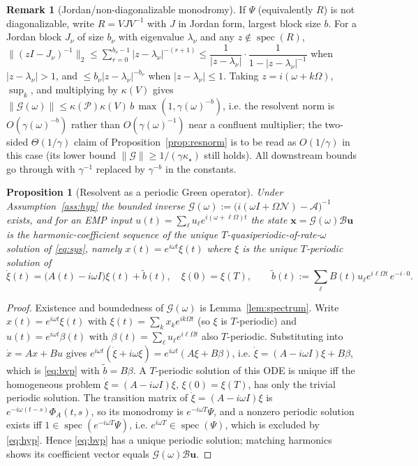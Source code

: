 \documentclass{amsart}
\newtheorem{proposition}{Proposition}
\theoremstyle{definition}
\newtheorem{remark}{Remark}
\DeclareMathOperator{\spec}{spec}
\newcommand{\norm}[1]{\left\lVert#1\right\rVert}
\newcommand{\Acal}{\mathcal{A}}
\newcommand{\Bcal}{\mathcal{B}}
\newcommand{\Ncal}{\mathcal{N}}
\begin{document}
\begin{remark}[Jordan/non-diagonalizable monodromy]\label{rem:jordan}
If $\Psi$ (equivalently $R$) is not diagonalizable, write $R=V J V^{-1}$ with $J$
in Jordan form, largest block size $b$. For a Jordan block $J_\nu$ of size
$b_\nu$ with eigenvalue $\lambda_\nu$ and any $z\notin\spec(R)$,
$\|(zI-J_\nu)^{-1}\|_2\le \sum_{r=0}^{b_\nu-1}|z-\lambda_\nu|^{-(r+1)}
\le \dfrac{1}{|z-\lambda_\nu|}\cdot\dfrac{1}{1-|z-\lambda_\nu|^{-1}}$ when
$|z-\lambda_\nu|>1$, and $\le b_\nu|z-\lambda_\nu|^{-b_\nu}$ when
$|z-\lambda_\nu|\le1$. Taking $z=i(\omega+k\Omega)$, $\sup_k$, and multiplying by
$\kappa(V)$ gives
$\norm{\mathcal G(\omega)}\le \kappa(\mathcal P)\kappa(V)\,
b\,\max(1,\gamma(\omega)^{-b})$, i.e. the resolvent norm is
$O(\gamma(\omega)^{-b})$ rather than $O(\gamma(\omega)^{-1})$ near a confluent
multiplier; the two-sided $\Theta(1/\gamma)$ claim of
Proposition~\ref{prop:resnorm} is to be read as $O(1/\gamma)$ in this case (its
lower bound $\norm{\mathcal G}\ge1/(\gamma\kappa_\star)$ still holds). All
downstream bounds go through with $\gamma^{-1}$ replaced by $\gamma^{-b}$ in the
constants.
\end{remark}

\begin{proposition}[Resolvent as a periodic Green operator]\label{prop:green}
Under Assumption~\ref{ass:hyp} the bounded inverse
$\mathcal G(\omega):=\big(i(\omega I+\Omega\Ncal)-\Acal\big)^{-1}$ exists, and
for an EMP input $u(t)=\sum_\ell u_\ell e^{i(\omega+\ell\Omega)t}$ the state
$\mathbf x=\mathcal G(\omega)\Bcal\mathbf u$ is the harmonic-coefficient
sequence of the \emph{unique} $T$-quasiperiodic-of-rate-$\omega$ solution of
\eqref{eq:sys}, namely $x(t)=e^{i\omega t}\xi(t)$ where $\xi$ is the unique
$T$-periodic solution of
\begin{equation}\label{eq:bvp}
\dot\xi(t)=\big(A(t)-i\omega I\big)\xi(t)+\tilde b(t),\quad \xi(0)=\xi(T),\qquad
\tilde b(t):=\sum_\ell B(t)u_\ell e^{i\ell\Omega t}\,e^{-i\cdot 0}.
\end{equation}
\end{proposition}

\begin{proof}
Existence and boundedness of $\mathcal G(\omega)$ is Lemma~\ref{lem:spectrum}.
Write $x(t)=e^{i\omega t}\xi(t)$ with $\xi(t)=\sum_k x_k e^{ik\Omega t}$ (so
$\xi$ is $T$-periodic) and $u(t)=e^{i\omega t}\beta(t)$ with
$\beta(t)=\sum_\ell u_\ell e^{i\ell\Omega t}$ also $T$-periodic. Substituting
into $\dot x=A x+Bu$ gives
$e^{i\omega t}(\dot\xi+i\omega\xi)=e^{i\omega t}(A\xi+B\beta)$, i.e.
$\dot\xi=(A-i\omega I)\xi+B\beta$, which is \eqref{eq:bvp} with
$\tilde b=B\beta$. A $T$-periodic solution of this ODE is unique iff the
homogeneous problem $\dot\xi=(A-i\omega I)\xi$, $\xi(0)=\xi(T)$, has only the
trivial periodic solution. The transition matrix of $\dot\xi=(A-i\omega I)\xi$
is $e^{-i\omega(t-s)}\Phi_A(t,s)$, so its monodromy is $e^{-i\omega T}\Psi$, and
a nonzero periodic solution exists iff $1\in\spec(e^{-i\omega T}\Psi)$, i.e.
$e^{i\omega T}\in\spec(\Psi)$, which is excluded by \eqref{eq:hyp}. Hence
\eqref{eq:bvp} has a unique periodic solution; matching harmonics shows its
coefficient vector equals $\mathcal G(\omega)\Bcal\mathbf u$.
\end{proof}
\end{document}
